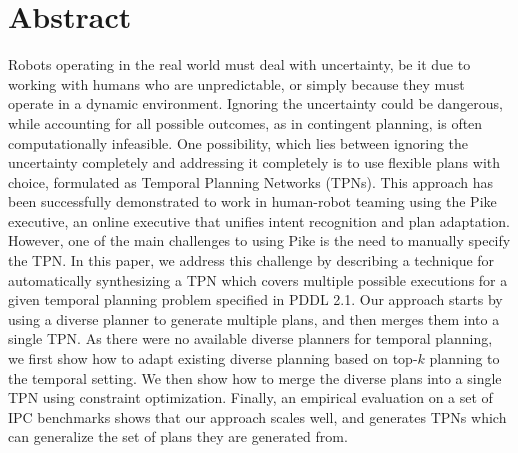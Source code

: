 \section*{Abstract}
Robots operating in the real world must deal with uncertainty, be it due to working with humans who are unpredictable, or simply because they must operate in a dynamic environment.
Ignoring the uncertainty could be dangerous, while accounting for all possible outcomes, as in contingent planning, is often computationally infeasible.
One possibility, which lies between ignoring the uncertainty completely and addressing it completely is to use flexible plans with choice, formulated as Temporal Planning Networks (TPNs). This approach has been successfully demonstrated to work in human-robot teaming using the Pike executive, an online executive that
unifies intent recognition and plan adaptation.
However, one of the main challenges to using Pike is the need to manually specify the TPN. In this paper, we address this challenge by describing a technique for automatically synthesizing a TPN which covers multiple possible executions for a given temporal planning problem specified in PDDL 2.1. Our approach starts by using a diverse planner to generate multiple plans, and then merges them into a single TPN. As there were no available diverse planners for temporal planning, we first show how to adapt existing diverse planning based on top-$k$ planning to the temporal setting.
We then show how to merge the diverse plans into a single TPN using constraint optimization. Finally, an empirical evaluation on a set of IPC benchmarks shows that our approach scales well, and generates TPNs which can generalize the set of plans they are generated from.
